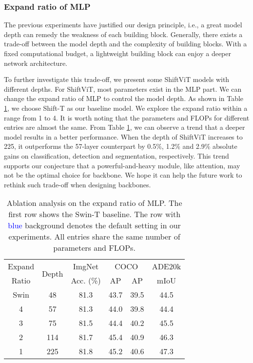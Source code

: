 \documentclass[letterpaper]{article} \usepackage{aaai22}  \usepackage{times}  \usepackage{helvet}  \usepackage{courier}  \usepackage[hyphens]{url}  \usepackage{graphicx} \usepackage{amsmath}
\begin{document}
\subsubsection{Expand ratio of MLP}

The previous experiments have justified our design principle, i.e., a great model depth can remedy the weakness of each building block. Generally, there exists a trade-off between the model depth and the complexity of building blocks. With a fixed computational budget, a lightweight building block can enjoy a deeper network architecture.

To further investigate this trade-off, we present some ShiftViT models with different depths. For ShiftViT, most parameters exist in the MLP part. We can change the expand ratio of MLP  to control the model depth. As shown in Table \ref{table:expand_ratio}, we choose Shift-T as our baseline model. We explore the expand ratio  within a range from 1 to 4. It is worth noting that the parameters and FLOPs for different entries are almost the same. 
From Table \ref{table:expand_ratio}, we can observe a trend that a deeper model results in a better performance. When the depth of ShiftViT increases to 225, it outperforms the 57-layer counterpart by 0.5\%, 1.2\% and 2.9\% absolute gains on classification, detection and segmentation, respectively. This trend supports our conjecture that a powerful-and-heavy module, like attention, may not be the optimal choice for backbone. We hope it can help the future work to rethink such trade-off when designing backbones.

\begin{table}[]
\centering
\caption{Ablation analysis on the expand ratio of MLP. The first row shows the Swin-T baseline. The row with \textcolor{Blue}{blue} background denotes the default setting in our experiments. All entries share the same number of parameters and FLOPs.}
\label{table:expand_ratio}
\begin{tabular}{c|c|c|cc|c}
\toprule
Expand & \multirow{2}{*}{Depth}  & ImgNet & \multicolumn{2}{c|}{COCO} & ADE20k \\ 
Ratio & & Acc. (\%) & AP & AP & mIoU \\ \midrule
Swin & 48 & 81.3 & 43.7 & 39.5 & 44.5 \\ \midrule
4 & 57 & 81.3 & 44.0 & 39.8 & 44.4 \\
3 & 75 & 81.5 & 44.4 & 40.2 & 45.5 \\
\rowcolor{Bg} 2 & 114 & 81.7 & 45.4 & 40.9 & 46.3 \\
1 & 225 & 81.8 & 45.2 & 40.6 & 47.3\\
\bottomrule
\end{tabular}
\end{table}
\end{document}

